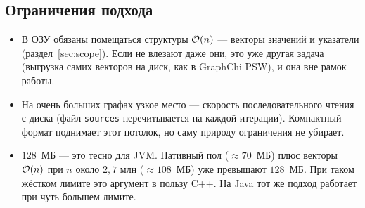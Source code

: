 \subsection{Ограничения подхода}
\label{sec:limits}
\begin{itemize}[itemsep=3pt]
  \item В ОЗУ обязаны помещаться структуры $\mathcal{O}(n)$ --- векторы значений и указатели
        (раздел~\ref{sec:scope}). Если не влезают даже они, это уже другая задача (выгрузка самих
        векторов на диск, как в GraphChi PSW), и она вне рамок работы.
  \item На очень больших графах узкое место --- скорость последовательного чтения с диска (файл
        \texttt{sources} перечитывается на каждой итерации). Компактный формат поднимает этот потолок,
        но саму природу ограничения не убирает.
  \item $128$~МБ --- это тесно для JVM. Нативный пол ($\approx 70$~МБ) плюс векторы $\mathcal{O}(n)$ при $n$
        около $2{,}7$ млн ($\approx 108$~МБ) уже превышают $128$~МБ. При таком жёстком лимите это
        аргумент в пользу C++. На Java тот же подход работает при чуть большем лимите.
\end{itemize}
